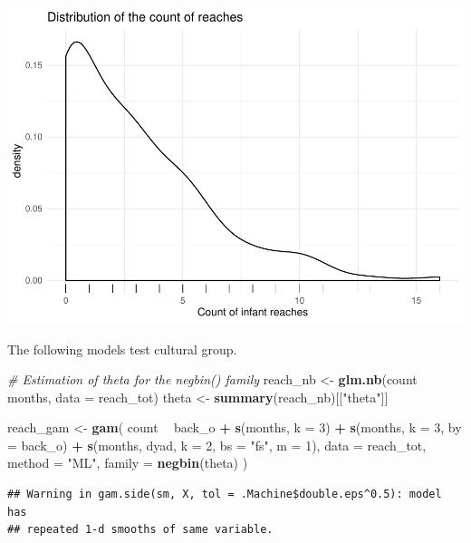 \documentclass[]{article}
\newenvironment{Shaded}{\begin{snugshade}}{\end{snugshade}}
\newcommand{\CommentTok}[1]{\textcolor[rgb]{0.56,0.35,0.01}{\textit{#1}}}
\newcommand{\DataTypeTok}[1]{\textcolor[rgb]{0.13,0.29,0.53}{#1}}
\newcommand{\DecValTok}[1]{\textcolor[rgb]{0.00,0.00,0.81}{#1}}
\newcommand{\KeywordTok}[1]{\textcolor[rgb]{0.13,0.29,0.53}{\textbf{#1}}}
\newcommand{\NormalTok}[1]{#1}
\newcommand{\OperatorTok}[1]{\textcolor[rgb]{0.81,0.36,0.00}{\textbf{#1}}}
\newcommand{\StringTok}[1]{\textcolor[rgb]{0.31,0.60,0.02}{#1}}
\begin{document}
\includegraphics{supplement_files/figure-latex/reaches-1.pdf}

The following models test cultural group.

\begin{Shaded}
\begin{Highlighting}[]
\CommentTok{# Estimation of theta for the negbin() family}
\NormalTok{reach_nb <-}\StringTok{ }\KeywordTok{glm.nb}\NormalTok{(count }\OperatorTok{~}\StringTok{ }\NormalTok{months, }\DataTypeTok{data =}\NormalTok{ reach_tot)}
\NormalTok{theta <-}\StringTok{ }\KeywordTok{summary}\NormalTok{(reach_nb)[[}\StringTok{"theta"}\NormalTok{]]}

\NormalTok{reach_gam <-}\StringTok{ }\KeywordTok{gam}\NormalTok{(}
\NormalTok{  count }\OperatorTok{~}
\StringTok{    }\NormalTok{back_o }\OperatorTok{+}
\StringTok{    }\KeywordTok{s}\NormalTok{(months, }\DataTypeTok{k =} \DecValTok{3}\NormalTok{) }\OperatorTok{+}
\StringTok{    }\KeywordTok{s}\NormalTok{(months, }\DataTypeTok{k =} \DecValTok{3}\NormalTok{, }\DataTypeTok{by =}\NormalTok{ back_o) }\OperatorTok{+}
\StringTok{    }\KeywordTok{s}\NormalTok{(months, dyad, }\DataTypeTok{k =} \DecValTok{2}\NormalTok{, }\DataTypeTok{bs =} \StringTok{"fs"}\NormalTok{, }\DataTypeTok{m =} \DecValTok{1}\NormalTok{),}
  \DataTypeTok{data =}\NormalTok{ reach_tot,}
  \DataTypeTok{method =} \StringTok{"ML"}\NormalTok{,}
  \DataTypeTok{family =} \KeywordTok{negbin}\NormalTok{(theta)}
\NormalTok{)}
\end{Highlighting}
\end{Shaded}

\begin{verbatim}
## Warning in gam.side(sm, X, tol = .Machine$double.eps^0.5): model has
## repeated 1-d smooths of same variable.
\end{verbatim}
\end{document}
